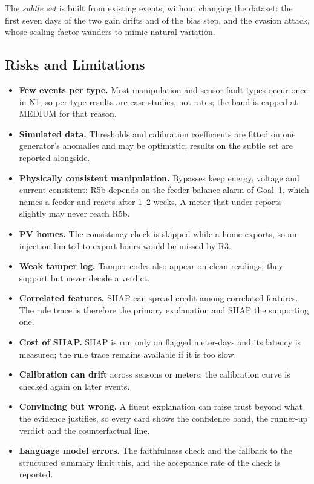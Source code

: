 The \emph{subtle set} is built from existing events, without changing the dataset: the first seven days of
the two gain drifts and of the bias step, and the evasion attack, whose scaling factor wanders to mimic
natural variation.

\subsection{Risks and Limitations}
\label{g2-sec:risks}
\begin{itemize}[leftmargin=*,itemsep=2pt]
  \item \textbf{Few events per type.} Most manipulation and sensor-fault types occur once in N1, so
        per-type results are case studies, not rates; the \SD{} band is capped at MEDIUM for that reason.
  \item \textbf{Simulated data.} Thresholds and calibration coefficients are fitted on one generator's
        anomalies and may be optimistic; results on the subtle set are reported alongside.
  \item \textbf{Physically consistent manipulation.} Bypasses keep energy, voltage and current consistent;
        R5b depends on the feeder-balance alarm of Goal~1, which names a feeder and reacts after 1--2 weeks. A
        meter that under-reports slightly may never reach R5b.
  \item \textbf{PV homes.} The consistency check is skipped while a home exports, so an injection limited to
        export hours would be missed by R3.
  \item \textbf{Weak tamper log.} Tamper codes also appear on clean readings; they support but never decide
        a verdict.
  \item \textbf{Correlated features.} SHAP can spread credit among correlated features. The rule trace is
        therefore the primary explanation and SHAP the supporting one.
  \item \textbf{Cost of SHAP.} SHAP is run only on flagged meter-days and its latency is measured; the rule
        trace remains available if it is too slow.
  \item \textbf{Calibration can drift} across seasons or meters; the calibration curve is checked again on
        later events.
  \item \textbf{Convincing but wrong.} A fluent explanation can raise trust beyond what the evidence
        justifies, so every card shows the confidence band, the runner-up verdict and the counterfactual line.
  \item \textbf{Language model errors.} The faithfulness check and the fallback to the structured summary
        limit this, and the acceptance rate of the check is reported.
\end{itemize}

